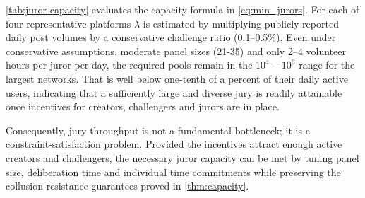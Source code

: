 \documentclass{article}
\begin{document}
\autoref{tab:juror-capacity} evaluates the capacity formula in \cref{eq:min_jurors}. For each of four representative platforms $\lambda$ is estimated by multiplying publicly reported daily post volumes by a conservative challenge ratio (0.1–0.5\%). Even under conservative assumptions, moderate panel sizes (21-35) and only 2–4 volunteer hours per juror per day, the required pools remain in the $10^{4}\!-\!10^{6}$ range for the largest networks. That is well below one‑tenth of a percent of their daily active users, indicating that a sufficiently large and diverse jury is readily attainable once incentives for creators, challengers and jurors are in place.

Consequently, jury throughput is not a fundamental bottleneck; it is a constraint‑satisfaction problem. Provided the incentives attract enough active creators and challengers, the necessary juror capacity can be met by tuning panel size, deliberation time and individual time commitments while preserving the collusion‑resistance guarantees proved in \autoref{thm:capacity}.
\end{document}
